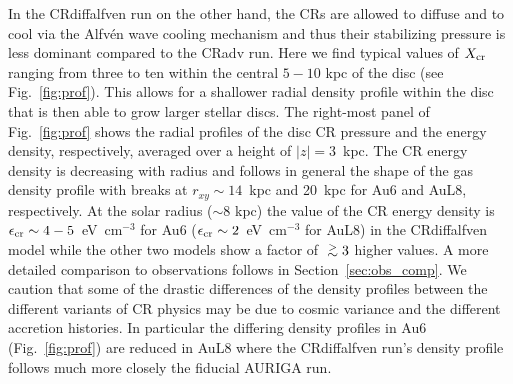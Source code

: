 \documentclass[useAMS,usenatbib]{mnras}
\newcommand{\gtsima}{$\; \buildrel > \over \sim \;$}
\newcommand{\gsim}{\lower.5ex\hbox{\gtsima}}
\begin{document}
In the CRdiffalfven run on the other hand, the CRs are allowed to diffuse and to cool via the Alfv\'en wave cooling mechanism and thus their stabilizing pressure is less dominant compared to the CRadv run. Here we find typical values of $X_{\rm cr}$ ranging from three to ten within the central $5-10$ kpc of the disc (see Fig.\ \ref{fig:prof}). This allows for a shallower radial density profile within the disc that is then able to grow larger stellar discs. The right-most panel of Fig.\ \ref{fig:prof} shows the radial profiles of the disc CR pressure and the energy density, respectively, averaged over a height of $|z|=3$~kpc. The CR energy density is decreasing with radius and follows in general the shape of the gas density profile with breaks at $r_{xy}\sim14$~kpc and 20~kpc for Au6 and AuL8, respectively. At the solar radius ($\sim8$ kpc) the value of the CR energy density is $\epsilon_{\rm cr}\sim4-5$~eV~cm$^{-3}$ for Au6 ($\epsilon_{\rm cr}\sim2$~eV~cm$^{-3}$ for AuL8) in the CRdiffalfven model while the other two models show a factor of $\gsim3$ higher values. A more detailed comparison to observations follows in Section~\ref{sec:obs_comp}.
We caution that some of the drastic differences of the density profiles between the different variants of CR physics may be due to cosmic variance and the different accretion histories. In particular the differing density profiles in Au6 (Fig.\ \ref{fig:prof}) are reduced in AuL8 where the CRdiffalfven run's density profile follows much more closely the fiducial AURIGA run.
\end{document}
